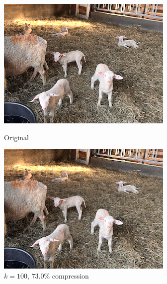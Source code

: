\begin{figure}[H]
  \centering
  \begin{minipage}[b]{0.4\textwidth}
    \includegraphics[width=\textwidth]{images/sheep.png}
    \caption{Original}
  \end{minipage}
  \hfill
  \begin{minipage}[b]{0.4\textwidth}
    \includegraphics[width=\textwidth]{images/compressed_sheep_100.png}
    \caption{$k = 100$, $73.0\%$ compression}
  \end{minipage}
\end{figure}


